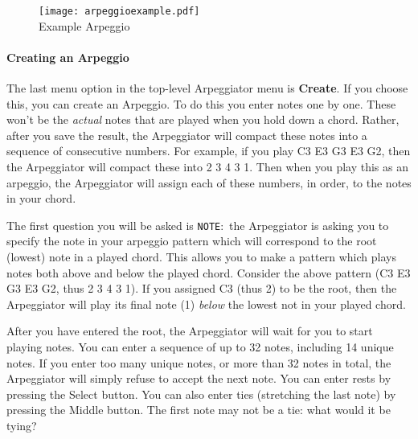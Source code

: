 \documentclass{article}
\begin{document}
\begin{figure}
\begin{center}
\vspace{-1em}
\texttt{[image: arpeggioexample.pdf]}\\
Example Arpeggio\\[2em]
\end{center}
\vspace{-2em}
\label{arpeggioediting}
\end{figure}

\paragraph{Creating an Arpeggio}

The last menu option in the top-level Arpeggiator menu is {\bf Create}.  If you choose this, you can create an Arpeggio.  To do this you enter notes one by one.  These won't be the {\it actual} notes that are played when you hold down a chord.  Rather, after you save the result, the Arpeggiator will compact these notes into a sequence of consecutive numbers.  For example, if you play C3 E3 G3 E3 G2, then the Arpeggiator will compact these into 2 3 4 3 1.  Then when you play this as an arpeggio, the Arpeggiator will assign each of these numbers, in order, to the notes in your chord. 

The first question you will be asked is \texttt{NOTE}:\ the Arpeggiator is asking you to specify the note in your arpeggio pattern which will correspond to the root (lowest) note in a played chord.  This allows you to make a pattern which plays notes both above and below the played chord.  Consider the above pattern (C3 E3 G3 E3 G2, thus 2 3 4 3 1).  If you assigned C3 (thus 2) to be the root, then the Arpeggiator will play its final note (1) {\it below} the lowest not in your played chord.

After you have entered the root, the Arpeggiator will wait for you to start playing notes.  You can enter a sequence of up to 32 notes, including 14 unique notes.  If you enter too many unique notes, or more than 32 notes in total, the Arpeggiator will simply refuse to accept the next note.  You can enter rests by pressing the Select button.  You can also enter ties (stretching the last note) by pressing the Middle button.  The first note may not be a tie: what would it be tying?
\end{document}
